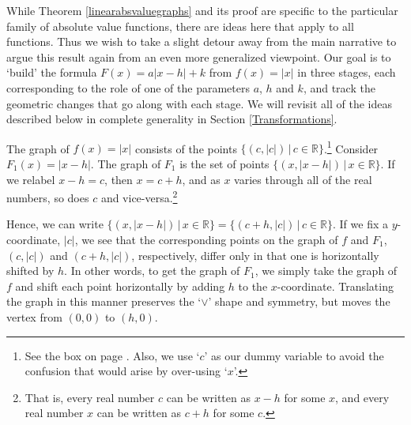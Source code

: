 \documentclass{ximera}
\begin{document}
\begin{image}

\end{image}

\medskip

While Theorem \ref{linearabsvaluegraphs} and its proof are specific to the particular family of absolute value functions, there are ideas here that apply to all functions.  Thus we wish to take a slight detour away from the main narrative to argue this result again from an even more generalized viewpoint. Our goal is to `build' the formula $F(x) = a|x - h| + k$ from $f(x) = |x|$ in three stages, each corresponding to the role of one of the parameters $a$, $h$ and $k$, and track the geometric changes that go along with each stage.  We will revisit all of the ideas described below in complete generality in Section \ref{Transformations}. 

\medskip

The graph of $f(x) = |x|$ consists of the points $\{ (c, |c|) \, | \, c \in \mathbb R\}$.\footnote{See the box on page \pageref{waystorepresentfunctionsbox}.  Also, we use `$c$'  as our dummy variable to avoid the confusion that would arise by over-using `$x$'.}    Consider $F_{1}(x) = |x - h|$.  The graph of $F_{1}$  is the set of points $\{ (x, |x - h|) \, | \, x \in \mathbb{R} \}$.  If we relabel $x - h = c$, then $x = c + h$, and as $x$ varies through all of the real numbers, so does $c$ and vice-versa.\footnote{That is, every real number $c$ can be written as $x - h$ for some $x$, and every real number $x$ can be written as $c + h$ for some $c$.}   

\medskip

Hence, we can write $\{ (x, |x - h|) \, | \, x \in \mathbb{R} \} = \{ (c + h, |c|) \, | \, c \in \mathbb{R} \}$.    If we fix a $y$-coordinate, $|c|$,  we see that the corresponding points on the graph of $f$ and $F_{1}$,  $(c, |c|)$ and $(c + h, |c|)$, respectively, differ only in that one is horizontally shifted by $h$.   In other words, to get the graph of $F_{1}$, we simply take the graph of $f$ and shift each point horizontally by adding $h$ to the $x$-coordinate.  Translating the graph in this manner preserves the `$\vee$' shape and symmetry, but moves the vertex from $(0, 0)$ to $(h, 0)$.
\end{document}
